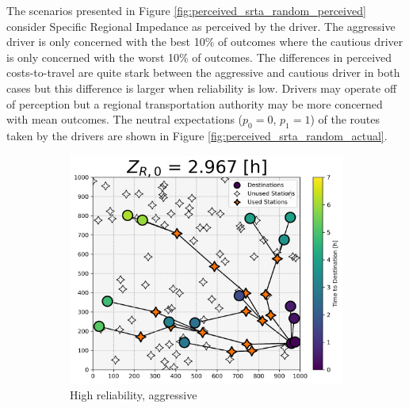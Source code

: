 \documentclass[11pt]{article}
\begin{document}
\begin{multicols}{2}
The scenarios presented in Figure \ref{fig:perceived_srta_random_perceived} consider Specific Regional Impedance as perceived by the driver. The aggressive driver is only concerned with the best 10\% of outcomes where the cautious driver is only concerned with the worst 10\% of outcomes. The differences in perceived costs-to-travel are quite stark between the aggressive and cautious driver in both cases but this difference is larger when reliability is low. Drivers may operate off of perception but a regional transportation authority may be more concerned with mean outcomes. The neutral expectations ($p_0 = 0$, $p_1 = 1$) of the routes taken by the drivers are shown in Figure \ref{fig:perceived_srta_random_actual}.

\begin{figure}[H]
	\centering
	\begin{subfigure}[t]{.5\linewidth}
		\centering\captionsetup{width = .8\linewidth}
		\includegraphics[width = \linewidth]{figs/random_example_high_reliability_aggressive_actual.png}
		\caption{High reliability, aggressive}
	\end{subfigure}%
	\begin{subfigure}[t]{.5\linewidth}
		\centering\captionsetup{width = .8\linewidth}

\end{subfigure}
\end{figure}
\end{multicols}
\end{document}
